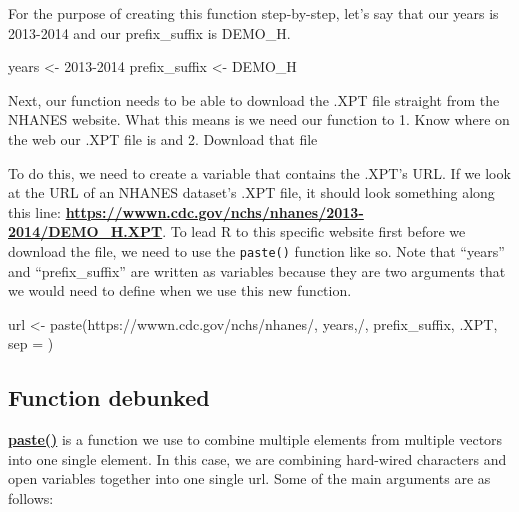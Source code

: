 \documentclass[
]{book}
\newenvironment{Shaded}{\begin{snugshade}}{\end{snugshade}}
\newcommand{\AttributeTok}[1]{\textcolor[rgb]{0.77,0.63,0.00}{#1}}
\newcommand{\FunctionTok}[1]{\textcolor[rgb]{0.00,0.00,0.00}{#1}}
\newcommand{\NormalTok}[1]{#1}
\newcommand{\OtherTok}[1]{\textcolor[rgb]{0.56,0.35,0.01}{#1}}
\newcommand{\StringTok}[1]{\textcolor[rgb]{0.31,0.60,0.02}{#1}}
\begin{document}
For the purpose of creating this function step-by-step, let's say that our years is 2013-2014 and our prefix\_suffix is DEMO\_H.

\begin{Shaded}
\begin{Highlighting}[]
\NormalTok{years }\OtherTok{\textless{}{-}} \StringTok{\textquotesingle{}2013{-}2014\textquotesingle{}}
\NormalTok{prefix\_suffix }\OtherTok{\textless{}{-}} \StringTok{\textquotesingle{}DEMO\_H\textquotesingle{}}
\end{Highlighting}
\end{Shaded}

Next, our function needs to be able to download the .XPT file straight from the NHANES website. What this means is we need our function to
1. Know where on the web our .XPT file is and
2. Download that file

To do this, we need to create a variable that contains the .XPT's URL. If we look at the URL of an NHANES dataset's .XPT file, it should look something along this line: \textbf{\url{https://wwwn.cdc.gov/nchs/nhanes/2013-2014/DEMO_H.XPT}}. To lead R to this specific website first before we download the file, we need to use the \texttt{paste()} function like so. Note that ``years'' and ``prefix\_suffix'' are written as variables because they are two arguments that we would need to define when we use this new function.

\begin{Shaded}
\begin{Highlighting}[]
\NormalTok{url }\OtherTok{\textless{}{-}} \FunctionTok{paste}\NormalTok{(}\StringTok{\textquotesingle{}https://wwwn.cdc.gov/nchs/nhanes/\textquotesingle{}}\NormalTok{, years,}\StringTok{\textquotesingle{}/\textquotesingle{}}\NormalTok{, prefix\_suffix, }\StringTok{\textquotesingle{}.XPT\textquotesingle{}}\NormalTok{, }\AttributeTok{sep =} \StringTok{\textquotesingle{}\textquotesingle{}}\NormalTok{)}
\end{Highlighting}
\end{Shaded}

\hypertarget{function-debunked}{%
\subsection{Function debunked}\label{function-debunked}}

\textbf{\href{https://www.journaldev.com/40396/paste-in-r}{paste()}} is a function we use to combine multiple elements from multiple vectors into one single element. In this case, we are combining hard-wired characters and open variables together into one single url. Some of the main arguments are as follows:
\end{document}
